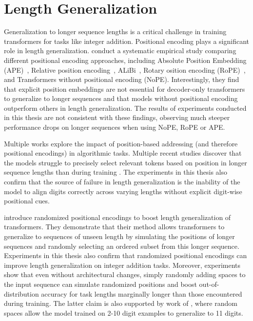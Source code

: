 \section{Length Generalization}\label{sec:sota_length_generalization}

Generalization to longer sequence lengths is a critical challenge in training transformers for tasks like integer addition. Positional encoding plays a significant role in length generalization. \cite{kazemnejad_impact_2023} conduct a systematic empirical study comparing different positional encoding approaches, including Absolute Position Embedding (APE)~\parencite{vaswani_attention_2017}, Relative position encoding~\parencite{shaw_self-attention_2018}, ALiBi~\parencite{press_train_2021}, Rotary osition encoding (RoPE)~\parencite{su_roformer_2024}, and Transformers without positional encoding (NoPE). Interestingly, they find that explicit position embeddings are not essential for decoder-only transformers to generalize to longer sequences and that models without positional encoding outperform others in length generalization. The results of experiments conducted in this thesis are not consistent with these findings, observing much steeper performance drops on longer sequences when using NoPE, RoPE or APE.

Multiple works explore the impact of position-based addressing (and therefore positional encodings) in algorithmic tasks. Multiple recent studies discover that the models struggle to precisely select relevant tokens based on position in longer sequence lengths than during training \parencite{ebrahimi_your_2024,shen_positional_2023,zhao_length_2024,zhou_what_2023,yehudai_when_2024}. The experiments in this thesis also confirm that the source of failure in length generalization is the inability of the model to align digits correctly across varying lengths without explicit digit-wise positional cues.

\cite{ruoss_randomized_2023} introduce randomized positional encodings to boost length generalization of transformers. They demonstrate that their method allows transformers to generalize to sequences of unseen length by simulating the positions of longer sequences and randomly selecting an ordered subset from this longer sequence. Experiments in this thesis also confirm that randomized positional encodings can improve length generalization on integer addition tasks. Moreover, experiments show that even without architectural changes, simply randomly adding spaces to the input sequence can simulate randomized positions and boost out-of-distribution accuracy for task lengths marginally longer than those encountered during training. The latter claim is also supported by work of \cite{shen_positional_2023}, where random spaces allow the model trained on 2-10 digit examples to generalize to 11 digits.

